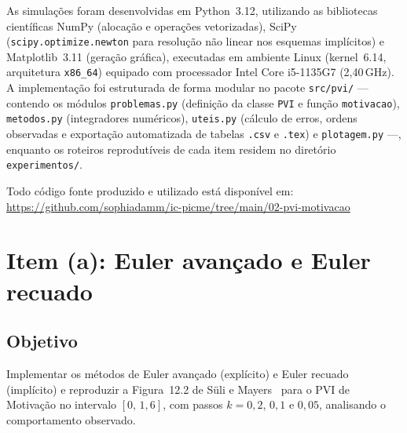 \documentclass[12pt, a4paper]{article}
\begin{document}
As simulações foram desenvolvidas em Python~3.12, utilizando as bibliotecas
científicas NumPy (alocação e operações
vetorizadas), SciPy (\texttt{scipy.optimize.newton} para resolução não linear nos
esquemas implícitos) e Matplotlib~3.11
(geração gráfica), executadas em ambiente Linux (kernel~6.14, arquitetura
\texttt{x86\_64}) equipado com processador
Intel Core i5-1135G7 (2{,}40\,GHz). A implementação foi estruturada de forma modular
no pacote \texttt{src/pvi/} —
contendo os módulos \texttt{problemas.py} (definição da classe \texttt{PVI} e função
\texttt{motivacao}),
\texttt{metodos.py} (integradores numéricos), \texttt{uteis.py} (cálculo de erros,
ordens observadas e exportação
automatizada de tabelas \texttt{.csv} e \texttt{.tex}) e \texttt{plotagem.py} —,
enquanto os roteiros reprodutíveis de
cada item residem no diretório \texttt{experimentos/}.

Todo código fonte produzido e utilizado está disponível em:
\url{https://github.com/sophiadamm/ic-picme/tree/main/02-pvi-motivacao}

\section{Item (a): Euler avançado e Euler recuado}
\label{sec:item-a}

\subsection{Objetivo}

Implementar os métodos de Euler avançado (explícito) e Euler recuado
(implícito) e reproduzir a Figura~12.2 de Süli e Mayers~\cite{suli2003}
para o PVI de Motivação no intervalo $[0,\,1{,}6]$, com passos
$k = 0{,}2$, $0{,}1$ e $0{,}05$, analisando o comportamento observado.

\end{document}
